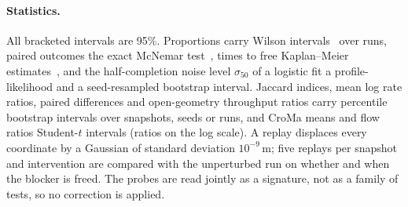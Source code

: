 \paragraph{Statistics.} All bracketed intervals are 95\%. Proportions carry Wilson intervals~\cite{wilson1927} over runs, paired outcomes the exact McNemar test~\cite{mcnemar1947}, times to free Kaplan--Meier estimates~\cite{kaplanmeier1958}, and the half-completion noise level $\sigma_{50}$ of a logistic fit a profile-likelihood and a seed-resampled bootstrap interval. Jaccard indices, mean log rate ratios, paired differences and open-geometry throughput ratios carry percentile bootstrap intervals over snapshots, seeds or runs, and CroMa means and flow ratios Student-$t$ intervals (ratios on the log scale). A replay displaces every coordinate by a Gaussian of standard deviation $10^{-9}$\,m; five replays per snapshot and intervention are compared with the unperturbed run on whether and when the blocker is freed. The probes are read jointly as a signature, not as a family of tests, so no correction is applied.
